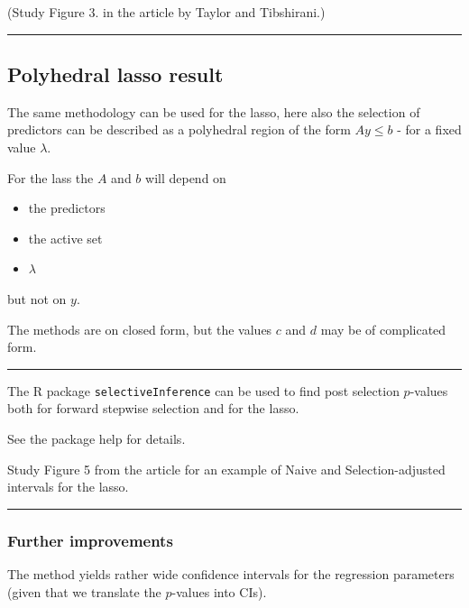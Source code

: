 \documentclass[
  letterpaper,
  DIV=11,
  numbers=noendperiod]{scrartcl}
\providecommand{\tightlist}{%
  \setlength{\itemsep}{0pt}\setlength{\parskip}{0pt}}\usepackage{longtable,booktabs,array}
\begin{document}
(Study Figure 3. in the article by Taylor and Tibshirani.)

\begin{center}\rule{0.5\linewidth}{0.5pt}\end{center}

\hypertarget{polyhedral-lasso-result}{%
\subsection{Polyhedral lasso result}\label{polyhedral-lasso-result}}

The same methodology can be used for the lasso, here also the selection
of predictors can be described as a polyhedral region of the form
\(Ay\le b\) - for a fixed value \(\lambda\).

For the lass the \(A\) and \(b\) will depend on

\begin{itemize}
\tightlist
\item
  the predictors
\item
  the active set
\item
  \(\lambda\)
\end{itemize}

but not on \(y\).

The methods are on closed form, but the values \(c\) and \(d\) may be of
complicated form.

\begin{center}\rule{0.5\linewidth}{0.5pt}\end{center}

The R package \texttt{selectiveInference} can be used to find post
selection \(p\)-values both for forward stepwise selection and for the
lasso.

See the package help for details.

Study Figure 5 from the article for an example of Naive and
Selection-adjusted intervals for the lasso.

\begin{center}\rule{0.5\linewidth}{0.5pt}\end{center}

\hypertarget{further-improvements}{%
\subsubsection{Further improvements}\label{further-improvements}}

The method yields rather wide confidence intervals for the regression
parameters (given that we translate the \(p\)-values into CIs).
\end{document}
